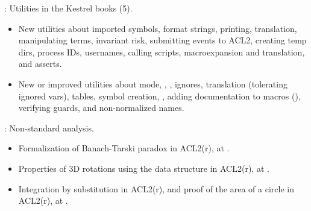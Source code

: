

\begin{frame}

\implibtitle

:
Utilities in the Kestrel books (5).
\begin{itemize}
\item New utilities about imported symbols, format strings,
  printing, translation, manipulating terms, invariant risk,
  submitting events to ACL2, creating temp dirs, process IDs,
  usernames, calling scripts, macroexpansion and translation, and asserts.
\item New or improved utilities about  mode,
  , , ignores, translation
  (tolerating ignored vars), tables, symbol creation, ,
  adding documentation to macros (), verifying
  guards, and non-normalized names.
\end{itemize}

\end{frame}





\begin{frame}

\implibtitle

:
Non-standard analysis.
\begin{itemize}
\item Formalization of Banach-Tarski paradox in ACL2(r),
      at .
\item Properties of 3D rotations
      using the  data structure in ACL2(r),
      at .
\item Integration by substitution in ACL2(r),
      and proof of the area of a circle in ACL2(r),
      at .
\end{itemize}

\end{frame}


